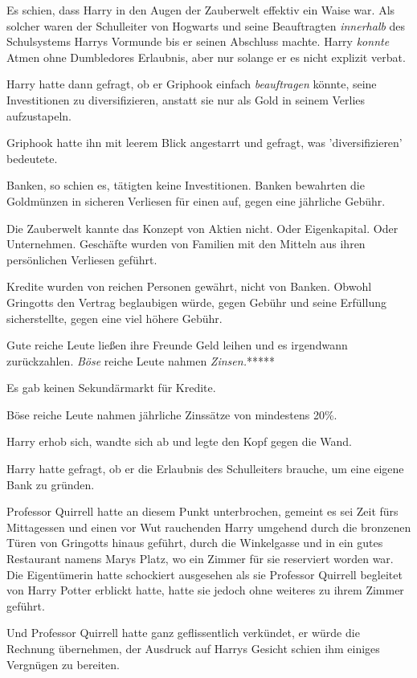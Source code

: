 {Es schien, dass Harry in den Augen der Zauberwelt effektiv ein Waise war. Als solcher waren der Schulleiter von Hogwarts und seine Beauftragten \emph{innerhalb} des Schulsystems Harrys Vormunde bis er seinen Abschluss machte. Harry \emph{konnte} Atmen ohne Dumbledores Erlaubnis, aber nur solange er es nicht explizit verbat.

Harry hatte dann gefragt, ob er Griphook einfach \emph{beauftragen} könnte, seine Investitionen zu diversifizieren, anstatt sie nur als Gold in seinem Verlies aufzustapeln.

Griphook hatte ihn mit leerem Blick angestarrt und gefragt, was 'diversifizieren' bedeutete.

Banken, so schien es, tätigten keine Investitionen. Banken bewahrten die Goldmünzen in sicheren Verliesen für einen auf, gegen eine jährliche Gebühr.

Die Zauberwelt kannte das Konzept von Aktien nicht. Oder Eigenkapital. Oder Unternehmen. Geschäfte wurden von Familien mit den Mitteln aus ihren persönlichen Verliesen geführt.

Kredite wurden von reichen Personen gewährt, nicht von Banken. Obwohl Gringotts den Vertrag beglaubigen würde, gegen Gebühr und seine Erfüllung sicherstellte, gegen eine viel höhere Gebühr.

Gute reiche Leute ließen ihre Freunde Geld leihen und es irgendwann zurückzahlen. \emph{Böse} reiche Leute nahmen \emph{Zinsen.}*****

Es gab keinen Sekundärmarkt für Kredite.

Böse reiche Leute nahmen jährliche Zinssätze von mindestens 20\%.

Harry erhob sich, wandte sich ab und legte den Kopf gegen die Wand.

Harry hatte gefragt, ob er die Erlaubnis des Schulleiters brauche, um eine eigene Bank zu gründen.

Professor Quirrell hatte an diesem Punkt unterbrochen, gemeint es sei Zeit fürs Mittagessen und einen vor Wut rauchenden Harry umgehend durch die bronzenen Türen von Gringotts hinaus geführt, durch die Winkelgasse und in ein gutes Restaurant namens Marys Platz, wo ein Zimmer für sie reserviert worden war. Die Eigentümerin hatte schockiert ausgesehen als sie Professor Quirrell begleitet von Harry Potter erblickt hatte, hatte sie jedoch ohne weiteres zu ihrem Zimmer geführt.

Und Professor Quirrell hatte ganz geflissentlich verkündet, er würde die Rechnung übernehmen, der Ausdruck auf Harrys Gesicht schien ihm einiges Vergnügen zu bereiten.

}
